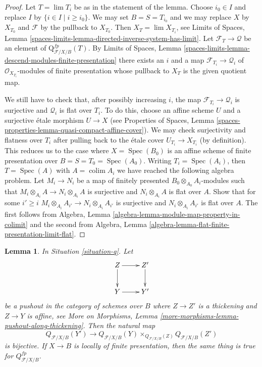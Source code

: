 \documentclass{stacks-project}
\theoremstyle{plain}
\newtheorem{lemma}[subsection]{Lemma}
\theoremstyle{definition}
\theoremstyle{remark}
\numberwithin{equation}{subsection}
\def\lim{\mathop{\mathrm{lim}}\nolimits}
\def\colim{\mathop{\mathrm{colim}}\nolimits}
\def\Spec{\mathop{\mathrm{Spec}}}
\begin{document}
\begin{proof}
Let $T = \lim T_i$ be as in the statement of the lemma.
Choose $i_0 \in I$ and replace $I$ by $\{i \in I \mid i \geq i_0\}$.
We may set $B = S = T_{i_0}$ and we may replace $X$ by $X_{T_0}$
and $\mathcal{F}$ by the pullback to $X_{T_0}$. Then
$X_T = \lim X_{T_i}$, see
Limits of Spaces, Lemma
\ref{spaces-limits-lemma-directed-inverse-system-has-limit}.
Let $\mathcal{F}_T \to \mathcal{Q}$ be an element of
$\text{Q}^{fp}_{\mathcal{F}/X/B}(T)$. By
Limits of Spaces, Lemma
\ref{spaces-limits-lemma-descend-modules-finite-presentation}
there exists an $i$ and a map $\mathcal{F}_{T_i} \to \mathcal{Q}_i$
of $\mathcal{O}_{X_{T_i}}$-modules of finite presentation whose
pullback to $X_T$ is the given quotient map.

\medskip\noindent
We still have to check that, after possibly increasing $i$, the map
$\mathcal{F}_{T_i} \to \mathcal{Q}_i$ is surjective and $\mathcal{Q}_i$
is flat over $T_i$. To do this, choose an affine scheme $U$ and a
surjective \'etale morphism $U \to X$ (see Properties of Spaces,
Lemma \ref{spaces-properties-lemma-quasi-compact-affine-cover}).
We may check surjectivity and flatness over $T_i$ after pulling
back to the \'etale cover $U_{T_i} \to X_{T_i}$ (by definition).
This reduces us to the case where $X = \Spec(B_0)$ is an affine scheme of
finite presentation over $B = S = T_0 = \Spec(A_0)$.
Writing $T_i = \Spec(A_i)$, then $T = \Spec(A)$ with $A = \colim A_i$
we have reached the following algebra problem. Let $M_i \to N_i$
be a map of finitely presented $B_0 \otimes_{A_0} A_i$-modules
such that $M_i \otimes_{A_i} A \to N_i \otimes_{A_i} A$ is surjective
and $N_i \otimes_{A_i} A$ is flat over $A$. Show that for some $i' \geq i$
$M_i \otimes_{A_i} A_{i'} \to N_i \otimes_{A_i} A_{i'}$ is surjective
and $N_i \otimes_{A_i} A_{i'}$ is flat over $A$.
The first follows from
Algebra, Lemma \ref{algebra-lemma-module-map-property-in-colimit}
and the second from
Algebra, Lemma \ref{algebra-lemma-flat-finite-presentation-limit-flat}.
\end{proof}

\begin{lemma}
\label{lemma-q-RS-star}
In Situation \ref{situation-q}. Let
$$
\xymatrix{
Z \ar[r] \ar[d] & Z' \ar[d] \\
Y \ar[r] & Y'
}
$$
be a pushout in the category of schemes over $B$ where
$Z \to Z'$ is a thickening and $Z \to Y$ is affine, see
More on Morphisms, Lemma \ref{more-morphisms-lemma-pushout-along-thickening}.
Then the natural map
$$
Q_{\mathcal{F}/X/B}(Y') \longrightarrow
Q_{\mathcal{F}/X/B}(Y) \times_{Q_{\mathcal{F}/X/B}(Z)} Q_{\mathcal{F}/X/B}(Z')
$$
is bijective. If $X \to B$ is locally of finite presentation, then
the same thing is true for $Q^{fp}_{\mathcal{F}/X/B}$.
\end{lemma}
\end{document}
